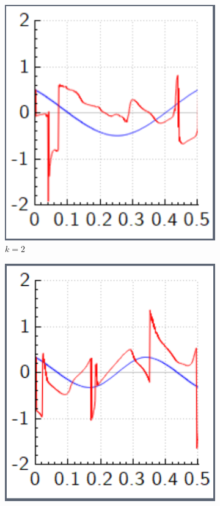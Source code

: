 \documentclass[aps,pra,reprint,superscriptaddress]{revtex4-1}
\begin{document}
\begin{figure}
	\begin{subfigure}{0.4\columnwidth}
		\includegraphics[width=\columnwidth]{graphics/similar_solutions/k2.PNG}
		\caption{$k=2$}
	\end{subfigure}
	\begin{subfigure}{0.4\columnwidth}
		\includegraphics[width=\columnwidth]{graphics/similar_solutions/k3.PNG}

\end{subfigure}
\end{figure}
\end{document}
